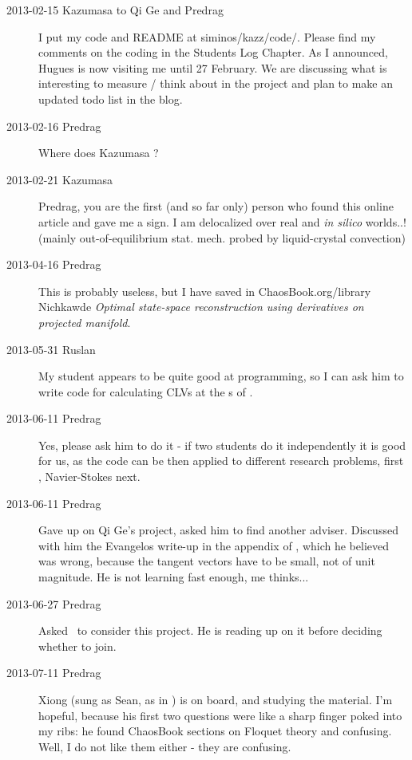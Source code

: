 \begin{description}
\item[2013-02-15 Kazumasa to Qi Ge and Predrag]
I put my code and README at siminos/kazz/code/.
Please find my comments on the coding in the Students Log Chapter.
As I announced, Hugues is now visiting me until 27 February.
We are discussing what is interesting to measure / think about in the project
 and plan to make an updated todo list in the blog.

\item[2013-02-16 Predrag]
Where does Kazumasa
?

\item[2013-02-21 Kazumasa]
Predrag, you are the first (and so far only) person who found this
online article and gave me a sign. I am delocalized over real and
\textit{in silico} worlds..! (mainly out-of-equilibrium stat. mech.
probed by liquid-crystal convection)

\item[2013-04-16 Predrag]
This is probably useless, but I have saved in ChaosBook.org/library
Nichkawde {\em Optimal state-space reconstruction
using derivatives on projected manifold}.

\item[2013-05-31 Ruslan]
My student appears to be quite good at programming, so I can ask him to
write code for calculating CLVs at the \rpo s of \KS.

\item[2013-06-11 Predrag]
Yes, please ask him to do it - if two students do it independently it
is good for us, as the code can be then applied to different research problems,
first \KS, Navier-Stokes next.


\item[2013-06-11 Predrag]
Gave up on Qi Ge's project, asked him to find another adviser.
Discussed with him the Evangelos write-up in the appendix of
, which he believed was wrong, because the tangent
vectors have to be small, not of unit magnitude. He is not learning
fast enough, me thinks...

\item[2013-06-27 Predrag] Asked \XD\ to consider this project.
He is reading up on it before deciding whether to join.

\item[2013-07-11 Predrag] Xiong (sung as Sean, as in
    ) is on
    board, and studying the material. I'm hopeful, because his first
    two questions were like a sharp finger poked into my ribs: he found
    ChaosBook sections on
     {Floquet
    theory} and 
    {{\PoincSec} \jacobianMs} confusing. Well, I do not like them
    either - they are confusing.


\end{description}
